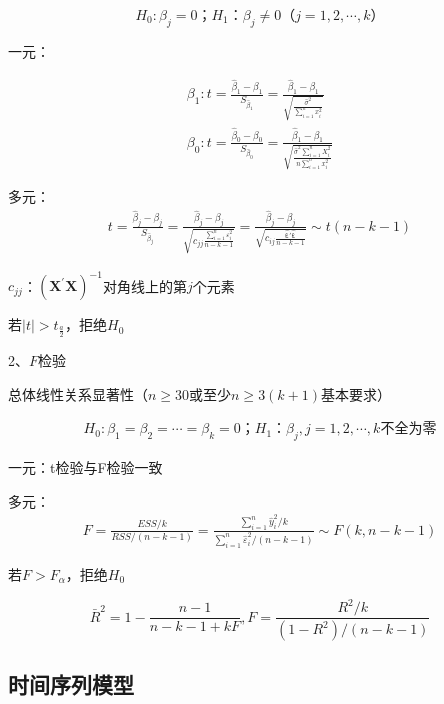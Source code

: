 \documentclass[12pt]{book}
\begin{document}
$$
H_0:\beta_j=0；H_1：β_j≠0（j=1,2,⋯,k）
$$

一元：

\begin{gather*}
\beta_1:
t
=\frac{\hat{\beta}_1-\beta_1}{S_{\hat{\beta}_1}} 
=\frac{\hat{\beta}_1-\beta_1}{\sqrt{\frac{\hat{\sigma}^2}{\sum_{i=1}^{n}{x_i^2}}}}\\
\beta_0: 
t
=\frac{\hat{\beta}_0-\beta_0}{S_{\hat{\beta}_0}} 
=\frac{\hat{\beta}_1-\beta_1}{\sqrt{\frac{\hat{\sigma}^2\sum_{i=1}^{n}{X_i^2}}{n \sum_{i=1}^{n}{x_i^2}}}}
\end{gather*}


多元：
\begin{gather*}
    t=\frac{\hat{\beta}_j-\beta_j}{S_{\hat{\beta}_j}} =\frac{\hat{\beta}_j-\beta_j}{\sqrt{c_{jj}\frac{\sum_{i=1}^{n}{\varepsilon_i^2}}{n -k-1}}} =\frac{\hat{\beta}_j-\beta_j}{\sqrt{c_{ij}\frac{\bm{\hat{\varepsilon}}' \bm{ \hat{\varepsilon}}}{n -k-1}}} \sim t(n-k-1)
\end{gather*}


$c_{jj}$：$\left(\bm{X}^\prime\bm{X}\right)^{-1}$对角线上的第$j$个元素

若$\left|t\right|>t_{\frac{a}{2}}$，拒绝$H_0$

2、$F$检验

总体线性关系显著性（$n\geq 30$或至少$n\geq3\left(k+1\right)$基本要求）

\begin{gather*}
    H_0:\beta_1=\beta_2=\cdots=\beta_k=0；H_1：β_{j}, j=1,2,⋯,k\text{不全为零}
\end{gather*}


一元：t检验与F检验一致

多元：
\begin{gather*}
F=\frac{ESS/k}{RSS/(n-k-1)} = \frac{\sum_{i=1}^{n}{\hat{y}_i^2/k}}{\sum_{i=1}^{n}{\hat{\varepsilon}_i^2/(n-k-1)}}\sim F(k,n-k-1)
\end{gather*}


若$F>F_\alpha$，拒绝$H_0$

$$
{\bar{R}}^2=1-\frac{n-1}{n-k-1+kF}, F=\frac{R^2/k}{(1-R^2)/(n-k-1)}
$$












\subsection{时间序列模型}
\end{document}
